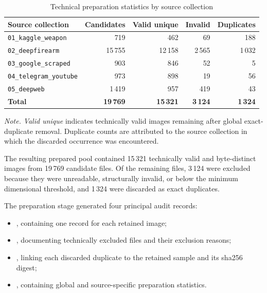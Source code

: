 \begin{table}[H]
\centering
\scriptsize
\renewcommand{\arraystretch}{1.15}
\setlength{\tabcolsep}{4pt}
\caption{Technical preparation statistics by source collection}
\label{tab:implementation-prepared-dataset-statistics}
\begin{tabularx}{\textwidth}{@{}>{\raggedright\arraybackslash}X rrrr@{}}
\toprule
\textbf{Source collection} &
\textbf{Candidates} &
\textbf{Valid unique} &
\textbf{Invalid} &
\textbf{Duplicates} \\
\midrule

\texttt{01\_kaggle\_weapon}
& 719
& 462
& 69
& 188 \\

\texttt{02\_deepfirearm}
& 15\,755
& 12\,158
& 2\,565
& 1\,032 \\

\texttt{03\_google\_scraped}
& 903
& 846
& 52
& 5 \\

\texttt{04\_telegram\_youtube}
& 973
& 898
& 19
& 56 \\

\texttt{05\_deepweb}
& 1\,419
& 957
& 419
& 43 \\

\midrule
\textbf{Total}
& \textbf{19\,769}
& \textbf{15\,321}
& \textbf{3\,124}
& \textbf{1\,324} \\

\bottomrule
\end{tabularx}

\vspace{0.4em}
\footnotesize
\textit{Note.} \textit{Valid unique} indicates technically valid images
remaining after global exact-duplicate removal. Duplicate counts are attributed
to the source collection in which the discarded occurrence was encountered.
\end{table}

The resulting prepared pool contained 15\,321 technically valid and
byte-distinct images from 19\,769 candidate files. Of the remaining files,
3\,124 were excluded because they were unreadable, structurally invalid, or
below the minimum dimensional threshold, and 1\,324 were discarded as exact
duplicates.

The preparation stage generated four principal audit records:

\begin{itemize}
\item {}, containing one
record for each retained image;

\item
{},
documenting technically excluded files and their exclusion reasons;

\item
{},
linking each discarded duplicate to the retained sample and its
\gls{sha256} digest;

\item
{},
containing global and source-specific preparation statistics.
\end{itemize}

